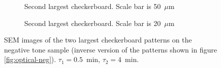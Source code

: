 \begin{figure}[htb]
\begin{subfigure}[t]{0.24\linewidth}
    	\centering
    	\caption{Second largest checkerboard. Scale bar is 50~$\mu$m}
    	\label{fig:b2d28_q28}
    \end{subfigure}
    \hfill
    \begin{subfigure}[t]{0.24\linewidth}
    	\centering
    	\caption{Second largest checkerboard. Scale bar is 20~$\mu$m}
    	\label{fig:b2d29_q29}
    \end{subfigure}
    \caption{SEM images of the two largest checkerboard patterns on the negative tone sample (inverse version of the patterns shown in figure \ref{fig:optical-neg}). $\tau_1 = 0.5$~min, $\tau_2 = 4$~min.}
    \label{fig:negative-sem}
\end{figure}

